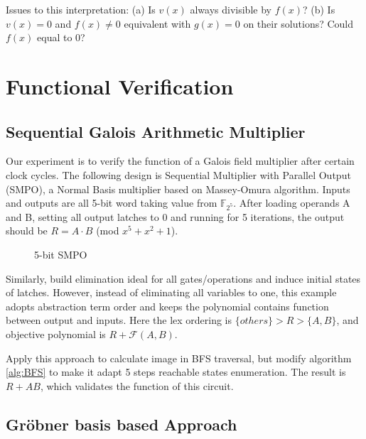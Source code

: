 \documentclass{acm_proc_article-sp}
\begin{document}
Issues to this interpretation: (a) Is $v(x)$ always divisible by $f(x)$? (b) Is $v(x)=0$ and
$f(x) \neq 0$ equivalent with $g(x)=0$ on their solutions? Could $f(x)$ equal to $0$?

\section{Functional Verification}
\subsection{Sequential Galois Arithmetic Multiplier}
Our experiment is to verify the function of a Galois field multiplier after certain clock cycles.
The following design is Sequential Multiplier with Parallel Output (SMPO),
a Normal Basis multiplier based on Massey-Omura algorithm. Inputs and outputs
are all 5-bit word taking value from ${\mathbb F}_{2^5}$. After loading operands
 A and B, setting all output latches to 0 and running for 5 iterations, the 
output should be $R = A\cdot B$ (mod $x^5 + x^2 + 1$).
\begin{figure}
\centering
{}
\caption{5-bit SMPO}
\label{fig:SMPO}
\end{figure}
Similarly, build elimination ideal for all gates/operations and induce
initial states of latches. However, instead of eliminating all variables
to one, this example adopts abstraction term order
and keeps the polynomial contains function between output and inputs.
Here the lex ordering is $\{others\} > R > \{A, B\}$, and objective
polynomial is $R + \mathcal{F}(A, B)$.

Apply this approach to calculate image in BFS traversal, but modify algorithm
\ref{alg:BFS} to make it adapt 5 steps reachable states enumeration.
The result is $R + AB$, which validates the function of this circuit.

\subsection{Gr\"obner basis based Approach}
\end{document}
